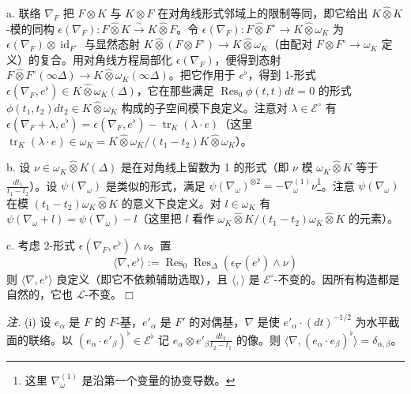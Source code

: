 a. 联络 $\nabla_{F}$ 把 $F\otimes K$ 与 $K\otimes F$ 在对角线形式邻域上的限制等同，即它给出 $K\widehat{\otimes}K$-模的同构 $\epsilon(\nabla_{F}):F\widehat{\otimes}K\xrightarrow{\sim}K\widehat{\otimes}F$。令 $\epsilon(\nabla_{F}):F\widehat{\otimes}F^{\circ}\to K\widehat{\otimes}\omega_{K}$ 为 $\epsilon(\nabla_{F})\otimes\operatorname{id}_{F^{\circ}}$ 与显然态射 $K\widehat{\otimes}(F\otimes F^{\circ})\to K\widehat{\otimes}\omega_{K}$（由配对 $F\otimes F^{\circ}\to\omega_{K}$ 定义）的复合。用对角线方程局部化 $\epsilon(\nabla_{F})$，便得到态射 $F\widehat{\otimes}F^{\circ}(\infty\Delta)\to K\widehat{\otimes}\omega_{K}(\infty\Delta)$。把它作用于 $e^{\flat}$，得到 1-形式 $\epsilon(\nabla_{F},e^{\flat})\in K\widehat{\otimes}\omega_{K}(\Delta)$，它在那些满足 $\operatorname{Res}_{0}\phi(t,t)dt=0$ 的形式 $\phi(t_{1},t_{2})dt_{2}\in K\widehat{\otimes}\omega_{K}$ 构成的子空间模下良定义。注意对 $\lambda\in\mathcal{E}^{\circ}$ 有 $\epsilon(\nabla_{F}+\lambda,e^{\flat})=\epsilon(\nabla_{F},e^{\flat})-\operatorname{tr}_{K}(\lambda\cdot e)$（这里 $\operatorname{tr}_{K}(\lambda\cdot e)\in\omega_{K}=K\widehat{\otimes}\omega_{K}/(t_{1}-t_{2})K\widehat{\otimes}\omega_{K}$）。

b. 设 $\nu\in\omega_{K}\widehat{\otimes}K(\Delta)$ 是在对角线上留数为 1 的形式（即 $\nu$ 模 $\omega_{K}\widehat{\otimes}K$ 等于 $\frac{dt_{1}}{t_{1}-t_{2}}$）。设 $\psi(\nabla_{\omega})$ 是类似的形式，满足 $\psi(\nabla_{\omega})^{\otimes2}=-\nabla^{(1)}_{\omega}\nu$\footnote{这里 $\nabla^{(1)}_{\omega}$ 是沿第一个变量的协变导数。}。注意 $\psi(\nabla_{\omega})$ 在模 $(t_{1}-t_{2})\omega_{K}\widehat{\otimes}K$ 的意义下良定义。对 $l\in\omega_{K}$ 有 $\psi(\nabla_{\omega}+l)=\psi(\nabla_{\omega})-l$（这里把 $l$ 看作 $\omega_{K}\widehat{\otimes}K/(t_{1}-t_{2})\omega_{K}\widehat{\otimes}K$ 的元素）。

c. 考虑 2-形式 $\epsilon(\nabla_{F},e^{\flat})\wedge\nu$。置
\[
\langle\nabla,e^{\flat}\rangle:=\operatorname{Res}_{0}\operatorname{Res}_{\Delta}(\epsilon_{\nabla}(e^{\flat})\wedge\nu)
\]
则 $\langle\nabla,e^{\flat}\rangle$ 良定义（即它不依赖辅助选取），且 $\langle,\rangle$ 是 $\mathcal{E}^{\circ}$-不变的。因所有构造都是自然的，它也 $\mathcal{L}$-不变。\hfill$\Box$

\emph{注.} (i) 设 $e_{\alpha}$ 是 $F$ 的 $F$-基，$e'_{\alpha}$ 是 $F'$ 的对偶基，$\nabla$ 是使 $e'_{\alpha}\cdot(dt)^{-1/2}$ 为水平截面的联络。以 $(e_{\alpha}\cdot e'_{\beta})^{\flat}\in\mathcal{E}^{\flat}$ 记 $e_{\alpha}\otimes e'_{\beta}\frac{dt_{2}}{t_{2}-t_{1}}$ 的像。则 $\langle\nabla,(e_{\alpha}\cdot e_{\beta})^{\flat}\rangle=\delta_{\alpha,\beta}$。

